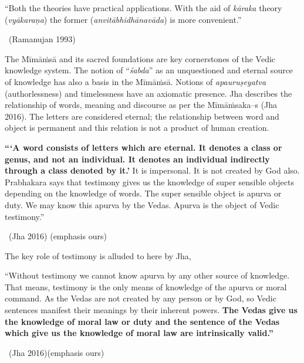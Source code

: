 \begin{myquote}
“Both the theories have practical applications. With the aid of \textit{kāraka} theory (\textit{vyākaraṇa}) the former (\textit{anvitābhidhānavāda}) is more convenient.”

~\hfill (Ramanujan 1993)
\end{myquote}

The Mīmāṁsā and its sacred foundations are key cornerstones of the Vedic knowledge system. The notion of “\textit{śabda}” as an unquestioned and eternal source of knowledge has also a basis in the Mīmāṁsā. Notions of \textit{apauruṣeyatva} (authorlessness) and timelessness have an axiomatic presence. Jha describes the relationship of words, meaning and discourse as per the Mīmāṁsaka–s (Jha 2016). The letters are considered eternal; the relationship between word and object is permanent and this relation is not a product of human creation.

\newpage

\begin{myquote}
\textbf{“‘A word consists of letters which are eternal. It denotes a class or genus, and not an individual. It denotes an individual indirectly through a class denoted by it.’} It is impersonal. It is not created by God also. Prabhakara says that testimony gives us the knowledge of super sensible objects depending on the knowledge of words. The super sensible object is apurva or duty. We may know this apurva by the Vedas. Apurva is the object of Vedic testimony.”

~\hfill (Jha 2016) (emphasis ours)
\end{myquote}

The key role of testimony is alluded to here by Jha,

\begin{myquote}
“Without testimony we cannot know apurva by any other source of knowledge. That means, testimony is the only means of knowledge of the apurva or moral command. As the Vedas are not created by any person or by God, so Vedic sentences manifest their meanings by their inherent powers. \textbf{The Vedas give us the knowledge of moral law or duty and the sentence of the Vedas which give us the knowledge of moral law are intrinsically valid.”}

~\hfill (Jha 2016)(emphasis ours)
\end{myquote}

